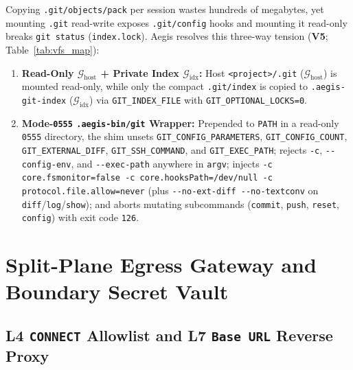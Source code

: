 \documentclass[10pt,twocolumn]{article}
\begin{document}
Copying \texttt{.git/objects/pack} per session wastes hundreds of megabytes, yet mounting \texttt{.git} read-write exposes \texttt{.git/config} hooks and mounting it read-only breaks \texttt{git status} (\texttt{index.lock}). Aegis resolves this three-way tension (\textbf{V5}; Table~\ref{tab:vfs_map}):
\begin{enumerate}
    \item \textbf{Read-Only $\mathcal{G}_{\text{host}}$ + Private Index $\mathcal{G}_{\text{idx}}$:} Host \texttt{<project>/.git} ($\mathcal{G}_{\text{host}}$) is mounted read-only, while only the compact \texttt{.git/index} is copied to \texttt{.aegis-git-index} ($\mathcal{G}_{\text{idx}}$) via \texttt{GIT\_INDEX\_FILE} with \texttt{GIT\_OPTIONAL\_LOCKS=0}.
    \item \textbf{Mode-\texttt{0555} \texttt{.aegis-bin/git} Wrapper:} Prepended to \texttt{PATH} in a read-only \texttt{0555} directory, the shim unsets \texttt{GIT\_\allowbreak CONFIG\_\allowbreak PARAMETERS}, \texttt{GIT\_\allowbreak CONFIG\_\allowbreak COUNT}, \texttt{GIT\_\allowbreak EXTERNAL\_\allowbreak DIFF}, \texttt{GIT\_\allowbreak SSH\_\allowbreak COMMAND}, and \texttt{GIT\_\allowbreak EXEC\_\allowbreak PATH}; rejects \texttt{-c}, \texttt{-\/-config-env}, and \texttt{-\/-exec-path} anywhere in \texttt{argv}; injects \texttt{-c core.fsmonitor=false -c core.hooksPath=/dev/null -c protocol.file.allow=never} (plus \texttt{-\/-no-ext-diff -\/-no-textconv} on \texttt{diff}/\texttt{log}/\texttt{show}); and aborts mutating subcommands (\texttt{commit}, \texttt{push}, \texttt{reset}, \texttt{config}) with exit code \texttt{126}.
\end{enumerate}

\section{Split-Plane Egress Gateway and Boundary Secret Vault}
\label{sec:egress}

\subsection{L4 \texttt{CONNECT} Allowlist and L7 \texttt{Base URL} Reverse Proxy}
\end{document}
